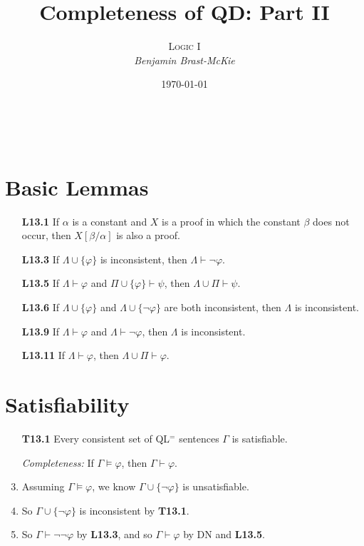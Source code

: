\documentclass[a4paper, 11pt]{article} %
\title{\textbf{Completeness of QD: Part II}} %
\author{\textsc{Logic I}\\ \em Benjamin Brast-McKie} %
\date{\today} %
\makeatletter
\def\proves{\ensuremath{\vdash}}
\newcommand{\set}[1]{\lbrace#1\rbrace} %
\newcommand{\unisub}[2]{[#1/#2]}
\renewcommand{\models}{\vDash}
\def\metaA{\ensuremath{\varphi}}
\def\metaB{\ensuremath{\psi}}
\renewcommand{\maketitle}{ %
\begin{flushright} %
{\LARGE\@title} %

\vspace{10pt} %

{\@author} %
\\\@date %

\vspace{-40pt} %
\end{flushright}
}
\makeatother
\begin{document}
\maketitle %

\thispagestyle{empty}



\section*{Basic Lemmas}

\begin{enumerate}
  \item[\bf L13.1] If $\alpha$ is a constant and $X$ is a proof in which the constant $\beta$ does not occur, then $X\unisub{\beta}{\alpha}$ is also a proof. 
  \item[\bf L13.3] If $\Lambda\cup\set{\metaA}$ is inconsistent, then $\Lambda\proves\neg\metaA$.
  \item[\bf L13.5] If $\Lambda \proves \metaA$ and $\Pi\cup\set{\metaA} \proves \metaB$, then $\Lambda\cup\Pi \proves \metaB$.
  \item[\bf L13.6] If $\Lambda \cup \set{\metaA}$ and $\Lambda\cup \set{\neg\metaA}$ are both inconsistent, then $\Lambda$ is inconsistent.
  \item[\bf L13.9] If $\Lambda\proves\metaA$ and $\Lambda\proves\neg\metaA$, then $\Lambda$ is inconsistent.
  \item[\bf L13.11] If $\Lambda\proves\metaA$, then $\Lambda\cup\Pi\proves\metaA$.
\end{enumerate}


\section*{Satisfiability}

\begin{enumerate}
  \item[\bf T13.1] Every consistent set of QL$^=$ sentences $\Gamma$ is satisfiable.
  \item[\it Completeness:] If $\Gamma\models\metaA$, then $\Gamma\proves\metaA$.
  \item Assuming $\Gamma\models\metaA$, we know $\Gamma\cup\set{\neg\metaA}$ is unsatisfiable.
  \item So $\Gamma\cup\set{\neg\metaA}$ is inconsistent by \textbf{T13.1}.
  \item So $\Gamma\proves\neg\neg\metaA$ by \textbf{L13.3}, and so $\Gamma\proves\metaA$ by DN and \textbf{L13.5}.
\end{enumerate}
\end{document}
